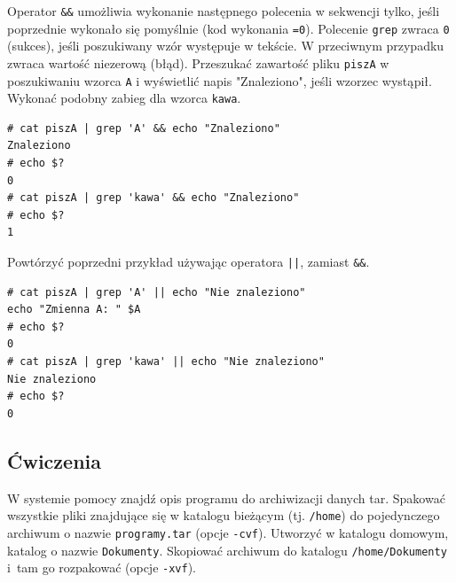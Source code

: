 \begin{example}
Operator \lstinline[style=MyBashStyle]{&&} umożliwia wykonanie następnego polecenia w sekwencji tylko, jeśli poprzednie wykonało się pomyślnie (kod wykonania \lstinline[style=MyBashStyle]{=0}). Polecenie \lstinline[style=MyBashStyle]{grep} zwraca \lstinline[style=MyBashStyle]{0} (sukces), jeśli poszukiwany wzór występuje w tekście. W przeciwnym przypadku zwraca wartość niezerową (błąd). Przeszukać zawartość pliku \lstinline[style=MyBashStyle]{piszA} w poszukiwaniu wzorca \lstinline[style=MyBashStyle]{A} i wyświetlić napis "Znaleziono", jeśli wzorzec wystąpił. Wykonać podobny zabieg dla wzorca \lstinline[style=MyBashStyle]{kawa}.

\begin{lstlisting}[style=MyBashStyle]
# cat piszA | grep 'A' && echo "Znaleziono"
Znaleziono
# echo $?
0
# cat piszA | grep 'kawa' && echo "Znaleziono"
# echo $?
1
\end{lstlisting}
\end{example}

\begin{example}
Powtórzyć poprzedni przykład używając operatora \lstinline[style=MyBashStyle]{||}, zamiast \lstinline[style=MyBashStyle]{&&}.
\begin{lstlisting}[style=MyBashStyle]
# cat piszA | grep 'A' || echo "Nie znaleziono"
echo "Zmienna A: " $A
# echo $?
0
# cat piszA | grep 'kawa' || echo "Nie znaleziono"
Nie znaleziono
# echo $?
0
\end{lstlisting}
\end{example}

\subsection{Ćwiczenia}

\begin{myenumerate}
\item W systemie pomocy znajdź opis programu do archiwizacji danych tar. Spakować wszystkie pliki znajdujące się w katalogu bieżącym (tj. \lstinline[style=MyBashStyle]{/home}) do pojedynczego archiwum o nazwie \lstinline[style=MyBashStyle]{programy.tar} (opcje \lstinline[style=MyBashStyle]{-cvf}). Utworzyć w katalogu domowym, katalog o nazwie \lstinline[style=MyBashStyle]{Dokumenty}. Skopiować archiwum do katalogu \lstinline[style=MyBashStyle]{/home/Dokumenty} i~tam go rozpakować (opcje \lstinline[style=MyBashStyle]{-xvf}).
\end{myenumerate}

\cleardoublepage
